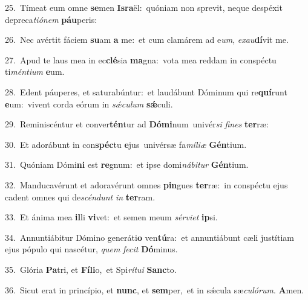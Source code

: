 {\numbfont\textcolor{\numbcolor}{25.}}~Tímeat eum omne \textbf{se}\-men \textbf{Is}\-\textbf{ra}ël:~\star quóniam non sprevit, neque despéxit depreca\-\textit{ti}\-\textit{ó}\textit{nem} \textbf{páu}\-peris:\par
{\numbfont\textcolor{\numbcolor}{26.}}~Nec avértit fáciem \textbf{su}\-am \textbf{a} me:~\star et cum clamárem ad e\-\textit{um}\-, \textit{ex}\-\textit{au}\textbf{dí}vit me.\par
{\numbfont\textcolor{\numbcolor}{27.}}~Apud te laus mea in ec\-\textbf{clé}\-sia \textbf{ma}\-gna:~\star vota mea reddam in conspéctu ti\-\textit{mén}\-\textit{ti}\textit{um} \textbf{e}\-um.\par
{\numbfont\textcolor{\numbcolor}{28.}}~Edent páuperes, et saturabúntur:~\dagger et laudábunt Dóminum qui re\-\textbf{quí}\-runt \textbf{e}\-um:~\star vivent corda eórum in \textit{sǽ}\-\textit{cu}\textit{lum} \textbf{sǽ}\-culi.\par
{\numbfont\textcolor{\numbcolor}{29.}}~Reminiscéntur et conver\-\textbf{tén}\-tur ad \textbf{Dó}\-\textbf{mi}num~\star univér\textit{si} \textit{fi}\-\textit{nes} \textbf{ter}\-ræ:\par
{\numbfont\textcolor{\numbcolor}{30.}}~Et adorábunt in con\-\textbf{spéc}\-tu \textbf{e}\-jus~\star univérsæ fa\-\textit{mí}\-\textit{li}\textit{æ} \textbf{Gén}\-tium.\par
{\numbfont\textcolor{\numbcolor}{31.}}~Quóniam Dómi\textbf{ni} est \textbf{re}\-gnum:~\star et ipse domi\-\textit{ná}\-\textit{bi}\textit{tur} \textbf{Gén}\-tium.\par
{\numbfont\textcolor{\numbcolor}{32.}}~Manducavérunt et adoravérunt omnes \textbf{pin}\-gues \textbf{ter}\-ræ:~\star in conspéctu ejus cadent omnes qui de\-\textit{scén}\-\textit{dunt} \textit{in} \textbf{ter}\-ram.\par
{\numbfont\textcolor{\numbcolor}{33.}}~Et ánima mea \textbf{il}\-li \textbf{vi}\-vet:~\star et semen meum \textit{sér}\-\textit{vi}\textit{et} \textbf{ip}\-si.\par
{\numbfont\textcolor{\numbcolor}{34.}}~Annuntiábitur Dómino generáti\textbf{o} ven\-\textbf{tú}\-ra:~\star et annuntiábunt cæli justítiam ejus pópulo qui nascétur, \textit{quem} \textit{fe}\-\textit{cit} \textbf{Dó}\-minus.\par
{\numbfont\textcolor{\numbcolor}{35.}}~Glória \textbf{Pa}\-tri, et \textbf{Fí}\-\textbf{li}o,~\star et Spi\-\textit{rí}\-\textit{tu}\textit{i} \textbf{Sanc}\-to.\par
{\numbfont\textcolor{\numbcolor}{36.}}~Sicut erat in princípio, et \textbf{nunc}\-, et \textbf{sem}\-per,~\star et in sǽcula sæ\-\textit{cu}\-\textit{ló}\textit{rum}. \textbf{A}\-men.\par
